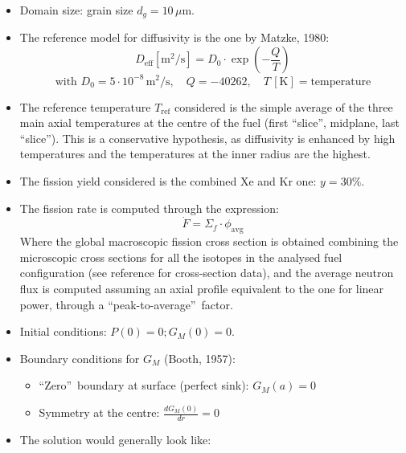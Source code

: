 \begin{itemize}
    \item Domain size: grain size $d_g=10\,\mu \text{m}$.
    \item The reference model for diffusivity is the one by Matzke, 1980:
          \begin{equation}
              D_{\text{eff}} [\text{m}^2/\text{s}] = D_0 \cdot \exp\left(-\frac{Q}{T}\right)
          \end{equation}
          \begin{equation}
              \text{with } D_0 = 5 \cdot 10^{-8}\,\text{m}^2/\text{s}, \quad Q = -40262, \quad T\,[\text{K}]= \text{temperature}
          \end{equation}
    \item The reference temperature $T_{\text{ref}}$ considered is the simple average of the three main axial temperatures at the centre of the fuel (first \textquotedblleft slice\textquotedblright, midplane, last \textquotedblleft slice\textquotedblright). This is a conservative hypothesis, as diffusivity is enhanced by high temperatures and the temperatures at the inner radius are the highest.
    \item The fission yield considered is the combined Xe and Kr one: $y=30\%$.
    \item The fission rate is computed through the expression:
          \begin{equation}
              \dot{F} = \Sigma_f \cdot \phi_{\text{avg}}
          \end{equation}
          Where the global macroscopic fission cross section is obtained combining the microscopic cross sections for all the isotopes in the analysed fuel configuration (see reference for cross-section data), and the average neutron flux is computed assuming an axial profile equivalent to the one for linear power, through a \textquotedblleft peak-to-average\textquotedblright\ factor.
    \item Initial conditions: $P(0) = 0; G_M(0) = 0$.
    \item Boundary conditions for $G_M$ (Booth, 1957):
          \begin{itemize}
              \item \textquotedblleft Zero\textquotedblright\ boundary at surface (perfect sink): $G_M(a) = 0$
              \item Symmetry at the centre: $\frac{dG_M(0)}{dr} = 0$
          \end{itemize}
    \item The solution would generally look like:

\end{itemize}
